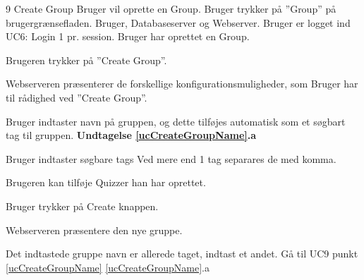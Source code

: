 
\uchead
	{9}
	{Create Group}
	{Bruger vil oprette en Group.}
	{Bruger trykker på ''Group'' på brugergrænsefladen.}
	{Bruger, Databaseserver og Webserver.}
	{Bruger er logget ind}
	{UC6: Login}
	{1 pr. session.}
	{Bruger har oprettet en Group.}
\item Brugeren trykker på ''Create Group''.

\item Webserveren præsenterer de forskellige konfigurationsmuligheder, som Bruger har til rådighed ved ''Create Group''.

\item \label{ucCreateGroupName} Bruger indtaster navn på gruppen, og dette tilføjes automatisk som et søgbart tag til gruppen. \textbf{Undtagelse \ref{ucCreateGroupName}.a}

\item Bruger indtaster søgbare tags Ved mere end 1 tag separares de med komma.
\item Brugeren kan tilføje Quizzer han har oprettet.

\item Bruger trykker på Create knappen.

\item Webserveren præsentere den nye gruppe.

\ucdescriptionend

\ucextension
	{Det indtastede gruppe navn er allerede taget, indtast et andet.}
	{Gå til UC9 punkt \ref{ucCreateGroupName}}
	{\ref{ucCreateGroupName}.a}
		
